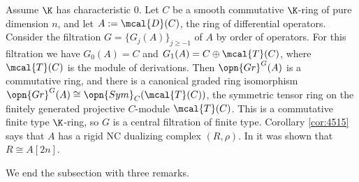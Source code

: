 \begin{exa} \label{exa:4515}
Assume $\K$ has characteristic $0$. Let $C$ be a smooth commutative 
$\K$-ring of pure dimension $n$, and let $A := \mcal{D}(C)$, the ring of 
differential operators. 
Consider the filtration
$G = \bigl\{ G_j(A) \bigr\}_{j \geq -1}$
of $A$ by order of operators. For this filtration we have 
$G_0(A) = C$ and 
$G_1(A) = C \oplus \mcal{T}(C)$,
where $\mcal{T}(C)$ is the module of derivations.
Then $\opn{Gr}^G(A)$ is a commutative ring, and there is a canonical 
graded ring isomorphism 
$\opn{Gr}^G(A) \cong \opn{Sym}_{C}(\mcal{T}(C))$,
the symmetric tensor ring on the finitely generated projective $C$-module 
$\mcal{T}(C)$. This is a commutative finite type $\K$-ring, so $G$ is a central 
filtration of finite type.
Corollary \ref{cor:4515} says that $A$ has a rigid NC dualizing complex 
$(R, \rho)$. In \cite{Ye4.5} it was shown that $R \cong A[2 n]$.
\end{exa}

We end the subsection with three remarks. 

